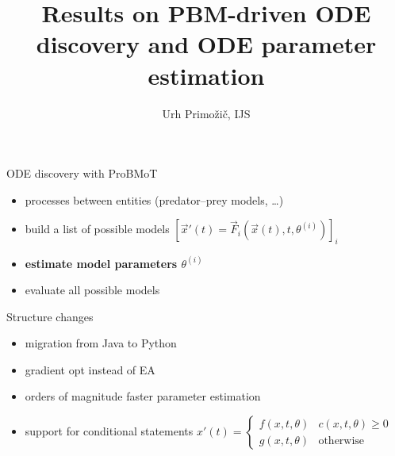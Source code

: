 \documentclass[14pt,aspectratio=169]{beamer}
\title{Results on PBM-driven ODE discovery and ODE parameter estimation}
\author{Urh Primožič, IJS}
\begin{document}
{
  \begin{frame}
    \titlepage
  \end{frame}
}

\begin{frame}{ODE discovery with ProBMoT}
\begin{itemize}
    \item processes between entities (predator--prey models, \dots)
    \item build a list of possible models $[\vec{x}'(t)=\vec F_i(\vec{x}(t), t, \theta^{(i)})]_i$
    \item \textbf{estimate model parameters $\theta^{(i)}$}
    \item evaluate all possible models
\end{itemize}
\end{frame}
 \begin{frame}{Structure changes}
    \begin{itemize}
        \item migration from Java to Python
        \item gradient opt instead of EA 
        \item orders of magnitude faster parameter estimation
        \item support for conditional statements $x'(t) = \begin{cases}
            f(x,t, \theta) & c(x, t, \theta) \geq 0 \\
            g(x,t,\theta) & \text{otherwise}
        \end{cases}$
    \end{itemize}
 \end{frame}
\end{document}
